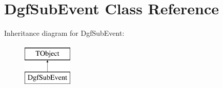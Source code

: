 \hypertarget{class_dgf_sub_event}{\section{Dgf\-Sub\-Event Class Reference}
\label{class_dgf_sub_event}
}
Inheritance diagram for Dgf\-Sub\-Event\-:\begin{figure}[H]
\begin{center}
\leavevmode
\includegraphics[height=2.000000cm]{class_dgf_sub_event}
\end{center}
\end{figure}
